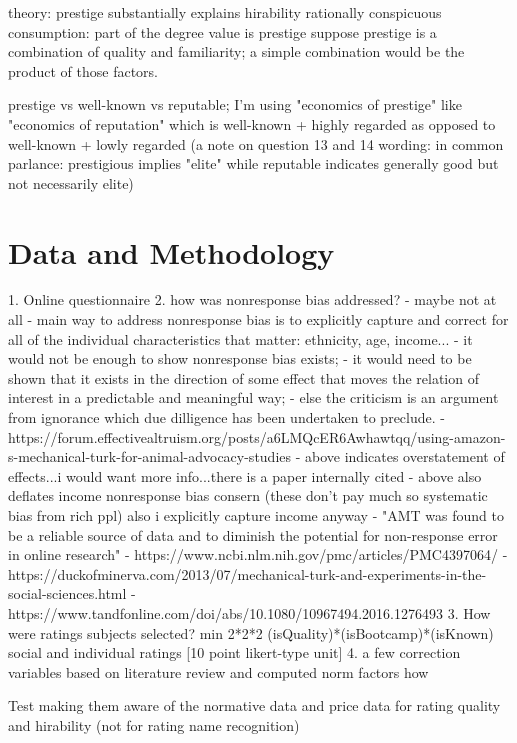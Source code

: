\documentclass[review]{elsarticle}
\begin{document}
theory: prestige substantially explains hirability
rationally conspicuous consumption: part of the degree value is prestige
suppose prestige is a combination of quality and familiarity; a simple combination would be the product of those factors.

prestige vs well-known vs reputable; I'm using "economics of prestige" like "economics of reputation"
which is well-known + highly regarded
as opposed to well-known + lowly regarded
(a note on question 13 and 14 wording:
in common parlance: prestigious implies "elite" while reputable indicates generally good but not necessarily elite)

\section{Data and Methodology}

1. Online questionnaire
2. how was nonresponse bias addressed? - maybe not at all
- main way to address nonresponse bias is to explicitly capture and correct for all of the individual characteristics that matter: ethnicity, age, income...
- it would not be enough to show nonresponse bias exists;
- it would need to be shown that it exists in the direction of some effect that moves the relation of interest in a predictable and meaningful way;
- else the criticism is an argument from ignorance which due dilligence has been undertaken to preclude.
- https://forum.effectivealtruism.org/posts/a6LMQcER6Awhawtqq/using-amazon-s-mechanical-turk-for-animal-advocacy-studies
- above indicates overstatement of effects...i would want more info...there is a paper internally cited
- above also deflates income nonresponse bias consern (these don't pay much so systematic bias from rich ppl) also i explicitly capture income anyway
- "AMT was found to be a reliable source of data and to diminish the potential for non-response error in online research"
- https://www.ncbi.nlm.nih.gov/pmc/articles/PMC4397064/
- https://duckofminerva.com/2013/07/mechanical-turk-and-experiments-in-the-social-sciences.html
- https://www.tandfonline.com/doi/abs/10.1080/10967494.2016.1276493
3. How were ratings subjects selected? min 2*2*2 (isQuality)*(isBootcamp)*(isKnown) social and individual ratings [10 point likert-type unit]
4. a few correction variables based on literature review and computed norm factors how

Test making them aware of the normative data and price data for rating quality and hirability (not for rating name recognition)
\end{document}
